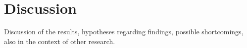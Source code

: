 \chapter{Discussion}\label{ch:4}

Discussion of the results, hypotheses regarding findings, possible shortcomings, also in the context of other research.